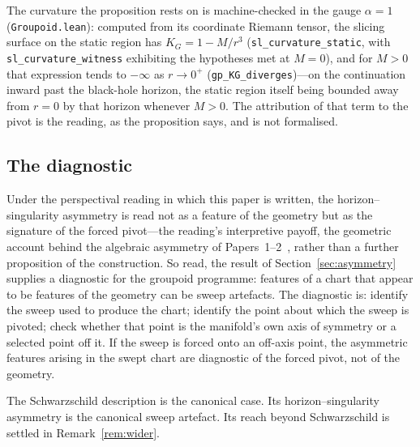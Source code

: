 \documentclass[11pt,a4paper]{article}
\theoremstyle{definition}
\begin{document}
The curvature the proposition rests on is machine-checked in the gauge $\alpha=1$ (\texttt{Groupoid.lean}): computed from its coordinate Riemann tensor, the slicing surface on the static region has $K_{G}=1-M/r^{3}$ (\texttt{sl\_curvature\_static}, with \texttt{sl\_curvature\_witness} exhibiting the hypotheses met at $M=0$), and for $M>0$ that expression tends to $-\infty$ as $r\to0^{+}$ (\texttt{gp\_KG\_diverges})---on the continuation inward past the black-hole horizon, the static region itself being bounded away from $r=0$ by that horizon whenever $M>0$. The attribution of that term to the pivot is the reading, as the proposition says, and is not formalised.

\subsection{The diagnostic}\label{sec:diagnostic}

Under the perspectival reading in which this paper is written, the horizon--singularity asymmetry is read not as a feature of the geometry but as the signature of the forced pivot---the reading's interpretive payoff, the geometric account behind the algebraic asymmetry of Papers~1--2~\cite{JanzenBHcausality,JanzenCircle}, rather than a further proposition of the construction. So read, the result of Section~\ref{sec:asymmetry} supplies a diagnostic for the groupoid programme: features of a chart that appear to be features of the geometry can be sweep artefacts. The diagnostic is: identify the sweep used to produce the chart; identify the point about which the sweep is pivoted; check whether that point is the manifold's own axis of symmetry or a selected point off it. If the sweep is forced onto an off-axis point, the asymmetric features arising in the swept chart are diagnostic of the forced pivot, not of the geometry.

The Schwarzschild description is the canonical case. Its horizon--singularity asymmetry is the canonical sweep artefact. Its reach beyond Schwarzschild is settled in Remark~\ref{rem:wider}.
\end{document}
